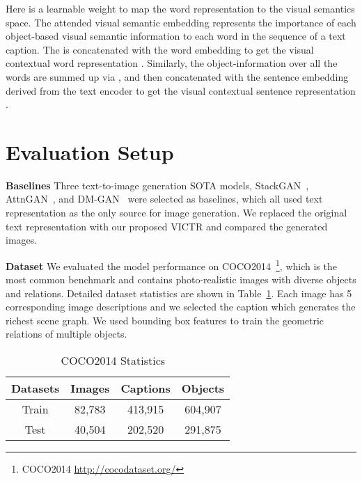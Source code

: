 \documentclass[11pt]{article}
\begin{document}
Here  is a learnable weight to map the word representation to the visual semantics space. The attended visual semantic embedding  represents the importance of each object-based visual semantic information to each word in the sequence of a text caption. The  is concatenated with the word embedding  to get the visual contextual word representation . Similarly, the object-information over all the words are summed up via , and then concatenated with the sentence embedding  derived from the text encoder to get the visual contextual sentence representation .


\section{Evaluation Setup}
\textbf{Baselines}
Three text-to-image generation SOTA models, StackGAN~\cite{zhang2017stackgan}, AttnGAN~\cite{xu2018attngan}, and DM-GAN~\cite{zhu2019dm} were selected as baselines, which all used text representation as the only source for image generation. We replaced the original text representation with our proposed VICTR and compared the generated images.


\noindent\textbf{Dataset}
We evaluated the model performance on COCO2014~\cite{lin2014microsoft}\footnote{COCO2014 \url{http://cocodataset.org/}}, which is the most common benchmark and contains photo-realistic images with diverse objects and relations. Detailed dataset statistics are shown in Table~\ref{tab:dataset_table}. Each image has 5 corresponding image descriptions and we selected the caption which generates the richest scene graph. We used bounding box features to train the geometric relations of multiple objects. 


\begin{table}[h]
    \centering
    \small
    \begin{tabular}{|c|c|c|c|}
    \hline \bf Datasets & \bf Images & \bf Captions & \bf Objects \\ \hline
    Train & 82,783 & 413,915 & 604,907  \\\hline
    Test &40,504 & 202,520 & 291,875 \\
    \hline
    \end{tabular}
    \caption{\label{tab:dataset_table} COCO2014 Statistics ~\cite{lin2014microsoft}}
\end{table}
\end{document}
